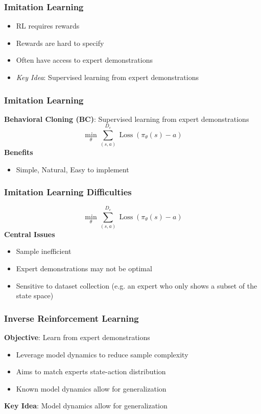 \documentclass{beamer}
\DeclareMathOperator{\loss}{Loss}
\begin{document}
\begin{frame}
\frametitle{Imitation Learning}
	\begin{itemize}
		\item RL requires rewards
		\vfill
		\item Rewards are hard to specify
		\vfill
		\item Often have access to expert demonstrations
		\vfill
		\item \emph{Key Idea}: Supervised learning from expert demonstrations
	\end{itemize}
\end{frame}

\begin{frame}
\frametitle{Imitation Learning}
	\textbf{Behavioral Cloning (BC)}: Supervised learning from expert demonstrations
	\[ 
		\min_{\theta} \sum_{(s,a)}^{D_e} \loss \left(\pi_\theta(s) - a \right)
	\]
	\vfill
	\textbf{Benefits}
	\begin{itemize}
		\item Simple, Natural, Easy to implement
	\end{itemize}
\end{frame}

\begin{frame}
	\frametitle{Imitation Learning Difficulties}
	\[ 
		\min_{\theta} \sum_{(s,a)}^{D_e} \loss \left(\pi_\theta(s) - a \right)
	\]
	\vfill
	\textbf{Central Issues}
	\begin{itemize}
		\item Sample inefficient
		\item Expert demonstrations may not be optimal
		\item Sensitive to dataset collection (e.g. an expert who only shows a subset of the state space)
	\end{itemize}
\end{frame}

\begin{frame}
	\frametitle{Inverse Reinforcement Learning}
	\textbf{Objective}: Learn from expert demonstrations
	\begin{itemize}
		\item Leverage model dynamics to reduce sample complexity
		\item Aims to match experts state-action distribution
		\item Known model dynamics allow for generalization
	\end{itemize}
	\vfill
	\textbf{Key Idea}: Model dynamics allow for generalization
\end{frame}
\end{document}
